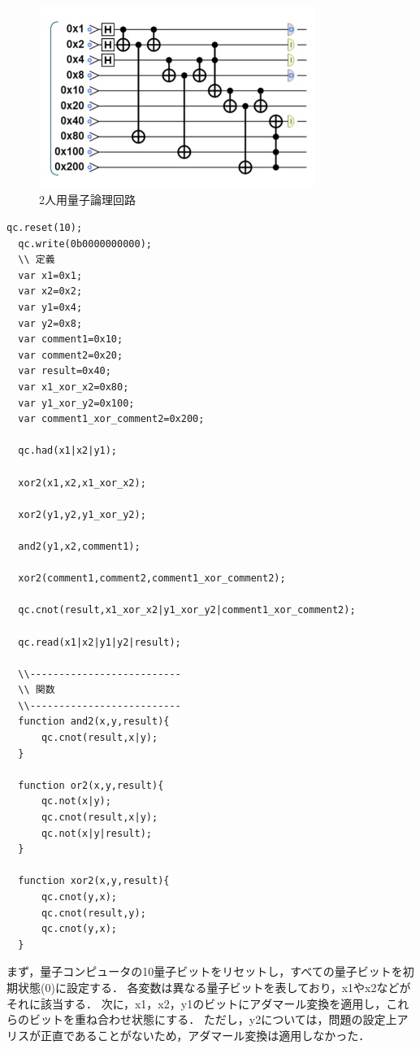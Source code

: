\documentclass[titlepage,a4paper]{jsarticle}
\begin{document}
\begin{figure}[H]
  \centering
  \includegraphics[width=0.8\textwidth]{img/2_qc.png}
  \caption{2人用量子論理回路}
  \label{2:回路}
\end{figure}

\begin{lstlisting}[caption=2人用QCEngin,label=2:ソースコード]
  qc.reset(10);         
  qc.write(0b0000000000);         
  \\ 定義
  var x1=0x1;
  var x2=0x2;
  var y1=0x4;
  var y2=0x8;
  var comment1=0x10;
  var comment2=0x20;
  var result=0x40;
  var x1_xor_x2=0x80;
  var y1_xor_y2=0x100;
  var comment1_xor_comment2=0x200;
  
  qc.had(x1|x2|y1);

  xor2(x1,x2,x1_xor_x2);

  xor2(y1,y2,y1_xor_y2);

  and2(y1,x2,comment1);

  xor2(comment1,comment2,comment1_xor_comment2);
  
  qc.cnot(result,x1_xor_x2|y1_xor_y2|comment1_xor_comment2);
 
  qc.read(x1|x2|y1|y2|result);

  \\--------------------------
  \\ 関数
  \\--------------------------
  function and2(x,y,result){
      qc.cnot(result,x|y);
  }
  
  function or2(x,y,result){
      qc.not(x|y);
      qc.cnot(result,x|y);
      qc.not(x|y|result);
  }
  
  function xor2(x,y,result){
      qc.cnot(y,x);
      qc.cnot(result,y);
      qc.cnot(y,x);
  }
\end{lstlisting}
まず，量子コンピュータの10量子ビットをリセットし，すべての量子ビットを初期状態(0)に設定する．
各変数は異なる量子ビットを表しており，x1やx2などがそれに該当する．
次に，x1，x2，y1のビットにアダマール変換を適用し，これらのビットを重ね合わせ状態にする．
ただし，y2については，問題の設定上アリスが正直であることがないため，アダマール変換は適用しなかった．
\end{document}
